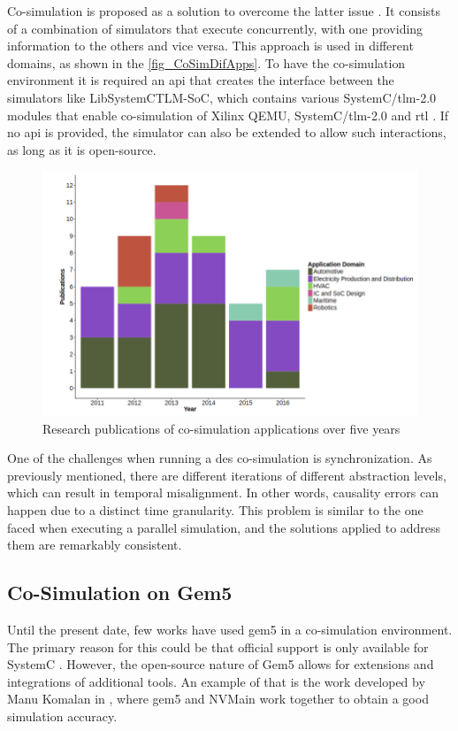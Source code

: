 Co-simulation is proposed as a solution to overcome the latter issue \cite{gomes2017co}. It consists of a combination of simulators that 
execute concurrently, with one providing information to the others and vice versa. This approach is used in different domains, as shown in 
the \autoref{fig_CoSimDifApps}. To have the co-simulation environment it is required an \gls{api} that creates the interface between the 
simulators like LibSystemCTLM-SoC, which contains various SystemC/\gls{tlm}-2.0 modules that enable co-simulation of Xilinx QEMU, 
SystemC/\gls{tlm}-2.0 and \gls{rtl} \cite{XilinxLibsystemctlm-SOC}. If no \gls{api} is provided, the simulator can also be extended to allow 
such interactions, as long
as it is open-source.

\begin{figure}[]
	\centering
 	\includegraphics[width=0.6\linewidth]{Images/CoSimDifApps.png}
 	\caption{Research publications of co-simulation applications over five years\cite{gomes2017co}}
	 \label{fig_CoSimDifApps}
\end{figure}

One of the challenges when running a \gls{des} co-simulation is synchronization. As previously mentioned, there are different 
iterations of different abstraction levels, which can result in temporal misalignment. In other words, causality errors can happen due to a 
distinct time granularity. This problem is similar to the one faced when executing a parallel simulation, and the solutions applied to address 
them are remarkably consistent. 


\subsection{Co-Simulation on Gem5}

Until the present date, few works have used gem5 in a co-simulation environment. The primary reason for this could be that official 
support is only available for SystemC \cite{Thegem5simulatorV2}. However, the open-source nature of Gem5 allows for extensions and 
integrations of additional tools. An example of that is the work developed by Manu Komalan in \cite{komalan2018main}, where gem5 and NVMain 
work together to obtain a good simulation accuracy.

